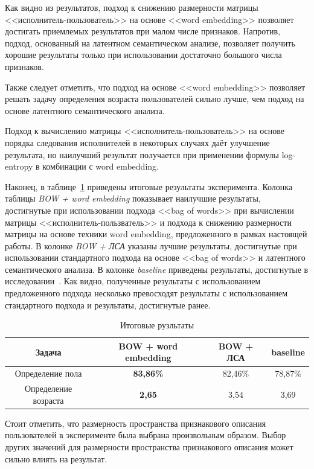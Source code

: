 Как видно из результатов, подход к снижению размерности
матрицы <<исполнитель-пользователь>> на основе <<word embedding>>
позволяет достигать приемлемых результатов при малом числе признаков.
Напротив, подход, основанный на латентном семантическом анализе,
позволяет получить хорошие результаты только при использовании
достаточно большого числа признаков.

Также следует отметить, что подход на основе <<word embedding>>
позволяет решать задачу определения возраста пользователей сильно
лучше, чем подход на основе латентного семантического анализа.

Подход к вычислению матрицы <<исполнитель-пользователь>> на
основе порядка следования исполнителей в некоторых случаях
даёт улучшение результата, но наилучший результат получается
при применении формулы log-entropy в комбинации с word embedding.

Наконец, в таблице~\ref{tab:total_results} приведены итоговые
результаты эксперимента. Колонка таблицы \textit{BOW + word embedding}
показывает наилучшие результаты, достигнутые при использовании
подхода <<bag of words>> при вычислении матрицы <<исполнитель-пользватель>>
и подхода к снижению размерности матрицы на основе техники
word embedding, предложенного в рамках настоящей работы. В колонке
\textit{BOW + ЛСА} указаны лучшие результаты, достигнутые при
использовании стандартного подхода на основе <<bag of words>>
и латентного семантического анализа. В колонке \textit{baseline}
приведены результаты, достигнутые в исследовании~\cite{wu2014gender}.
Как видно, полученные результаты с использованием предложенного подхода
несколько превосходят результаты с использованием стандартного подхода
и результаты, достигнутые ранее.

\begin{table}[!h]
    \caption{Итоговые рузльтаты}
    \label{tab:total_results}
\centering
\begin{tabular}{|c|c|c|c|}\hline
    \textbf{Задача} & \textbf{BOW + word embedding} & \textbf{BOW + ЛСА} & \textbf{baseline} \\\hline
    Определение пола & \textbf{83,86\%} & 82,46\% & 78,87\% \\\hline
    Определение возраста & \textbf{2,65} & 3,54 & 3,69 \\\hline
\end{tabular}
\end{table}

Стоит отметить, что размерность пространства признакового описания
пользователей в эксперименте была выбрана произвольным образом. Выбор
других значений для размерности пространства признакового
описания может сильно влиять на результат.


